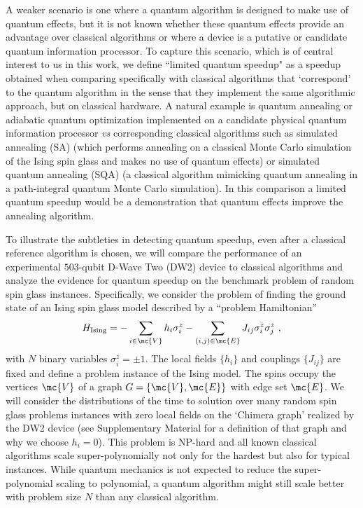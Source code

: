  A weaker scenario is one where a quantum algorithm is designed to make use of quantum effects, but it is not known whether these quantum effects provide an advantage over classical algorithms or where a device is a putative or candidate quantum information processor. To capture this scenario, which is of central interest to us in this work, we define ``limited quantum speedup" as a speedup obtained when comparing specifically with classical algorithms that `correspond' to the quantum algorithm in the sense that they implement the same algorithmic approach, but on classical hardware. A natural example is quantum annealing \cite{Kadowaki1998,Brooke1999} or adiabatic quantum optimization \cite{farhi} implemented on a candidate physical quantum information processor \textit{vs} corresponding classical algorithms such as simulated annealing (SA) \cite{Kirkpatrick1983} (which performs annealing on a classical Monte Carlo simulation of the Ising spin glass and makes no use of quantum effects) or simulated quantum annealing (SQA) \cite{PhysRevB.66.094203,Santoro} (a classical algorithm mimicking quantum annealing in a path-integral quantum Monte Carlo simulation). In this comparison a limited quantum speedup would be a demonstration that quantum effects improve the annealing algorithm.



To illustrate the subtleties in detecting quantum speedup, even after a classical reference algorithm is chosen, we will compare the performance of an experimental $503$-qubit D-Wave Two (DW2) device to classical algorithms and analyze the evidence for quantum speedup on the benchmark problem of random spin glass instances. Specifically, we consider the problem of finding the ground state of an Ising spin glass model described by a  ``problem Hamiltonian''  
\begin{equation}
H_{\mathrm{Ising}} = -\sum_{i\in \mc{V}} h_i \sigma_i^z - \sum_{(i,j)\in \mc{E}} J_{ij} \sigma_i^z \sigma_j^z \ ,
\label{eq:H}
\end{equation}
with $N$ binary variables $\sigma_i^z = \pm 1$. The local fields $\{h_i\}$ and couplings $\{J_{ij}\}$ are fixed and define a {problem instance} of the Ising model.
 The spins occupy the vertices $\mc{V}$ of a graph $G=\{\mc{V},\mc{E}\}$ with edge set $\mc{E}$. We will consider the distributions of the time to solution over many random spin glass problems  instances with zero local fields on the `Chimera graph' realized by the DW2 device (see Supplementary Material \cite{SM} for a definition of that graph and why we choose $h_i=0$). This problem is NP-hard\cite{Barahona1982} and all known classical algorithms scale super-polynomially not only for the hardest but also for typical instances. While quantum mechanics is not expected to reduce the super-polynomial scaling to polynomial, a quantum algorithm might still scale better with problem size $N$ than any classical algorithm. 


